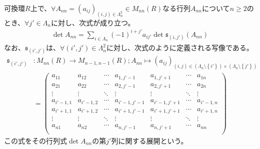 \documentclass[dvipdfmx]{jsarticle}
\begin{document}
\begin{thm}[行列式の展開]\label{2.1.11.11}
可換環$R$上で、$\forall A_{nn} = \left( a_{ij} \right)_{(i,j) \in \varLambda_{n}^{2}} \in M_{nn}(R)$なる行列$A_{nn}$について$n \geq 2$のとき、$\forall j' \in \varLambda_{n}$に対し、次式が成り立つ。
\begin{align*}
\det A_{nn} = \sum_{i \in \varLambda_{n}} {( - 1)^{i + j'}a_{ij'}\det{\mathfrak{s}_{\left( i,j' \right)}\left( A_{nn} \right)}}
\end{align*}
なお、$\mathfrak{s}_{\left( i',j' \right)}$は、$\forall\left( i',j' \right) \in \varLambda_{n}^{2}$に対し、次式のように定義される写像である。
\begin{align*}
\mathfrak{s}_{\left( i',j' \right)}&:M_{nn}(R) \rightarrow M_{n - 1,n - 1}(R);A_{nn} \mapsto \left( a_{ij} \right)_{(i,j) \in \left( \varLambda_{n} \setminus \left\{ i' \right\} \right) \times \left( \varLambda_{n} \setminus \left\{ j' \right\} \right)} \\ 
&= \begin{pmatrix}
a_{11} & a_{12} & \cdots & a_{1,j' - 1} & a_{1,j' + 1} & \cdots & a_{1n} \\
a_{21} & a_{22} & \cdots & a_{2,j' - 1} & a_{2,j' + 1} & \cdots & a_{2n} \\
 \vdots & \vdots & \ddots & \vdots & \vdots & \ddots & \vdots \\
a_{i' - 1,1} & a_{i' - 1,2} & \cdots & a_{i' - 1,j' - 1} & a_{i' - 1,j' + 1} & \cdots & a_{i' - 1,n} \\
a_{i' + 1,1} & a_{i' + 1,2} & \cdots & a_{i' + 1,j' - 1} & a_{i' + 1,j' + 1} & \cdots & a_{i' + 1,n} \\
 \vdots & \vdots & \ddots & \vdots & \vdots & \ddots & \vdots \\
a_{n1} & a_{n2} & \cdots & a_{n,j' - 1} & a_{n,j' + 1} & \cdots & a_{nn} \\
\end{pmatrix}
\end{align*}
この式をその行列式$\det A_{nn}$の第$j'$列に関する展開という。
\end{thm}
\end{document}
